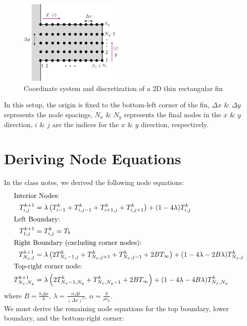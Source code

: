 \documentclass{article}
\newcommand{\ddfrac}[2]{\frac{\displaystyle #1}{\displaystyle #2}}
\begin{document}
\begin{figure}[h]
    \centering
    \includegraphics[width=0.45\textwidth]{fig/finSetup.png}
    \caption{Coordinate system and discretization of a 2D thin rectangular fin}
    \label{fig:finSetup}
\end{figure}

In this setup, the origin is fixed to the bottom-left corner of the fin, $\Delta x$ \& $\Delta y$ represents the node spacings, $N_x$ \& $N_y$ represents the final nodes in the $x$ \& $y$ direction, $i$ \& $j$ are the indices for the $x$ \& $y$ direction, respectively.

\pagebreak

\section{Deriving Node Equations}

In the class notes, we derived the following node equations:
\begin{align}
    \shortintertext{Interior Nodes:}
    T_{i,j}^{k+1}     & = \lambda\left(T_{i-1}^k + T_{i,j-1}^k + T_{i+1,j}^k + T_{i,j+1}^k\right) + (1-4\lambda)T_{i,j}^k                         \\
    \shortintertext{Left Boundary:}
    T_{1,j}^{k+1}     & = T_{i,j}^k = T_b \\
    \shortintertext{Right Boundary (excluding corner nodes):}
    T_{N_x,j}^{k+1}   & = \lambda\left(2T_{N_x-1,j}^k + T_{N_x,j+1}^k + T_{N_x,j-1}^k + 2BT_{\infty}\right) + (1-4\lambda - 2B\lambda)T_{N_x,j}^k \\
    \shortintertext{Top-right corner node:}
    T_{N_x,N_y}^{k+1} & = \lambda\left(2T_{N_x-1,N_y}^k + T_{N_x,N_y-1}^k + 2BT_{\infty}\right) + (1-4\lambda - 4B\lambda)T_{N_x,N_y}^k
\end{align}
where $B = \ddfrac{h \Delta x}{k}$, $\lambda = \ddfrac{\alpha \Delta t}{(\Delta x)^2}$, $\alpha = \ddfrac{k}{\rho c_p}$.\\

We must derive the remaining node equations for the top boundary, lower boundary, and the bottom-right corner:
\end{document}

